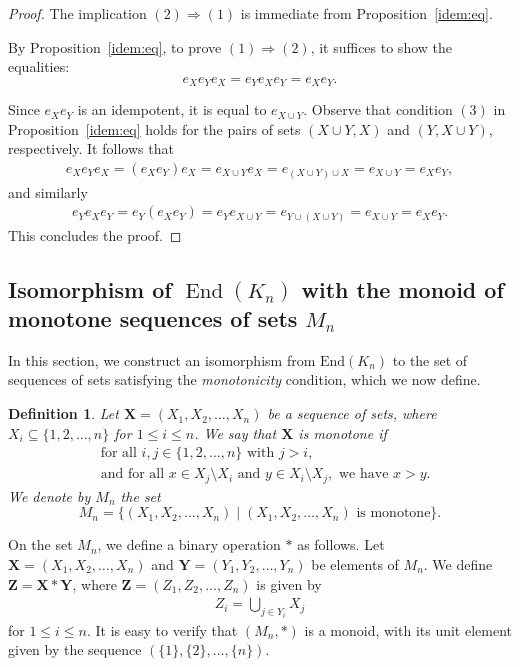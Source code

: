 \documentclass[pdflatex,sn-mathphys-num]{sn-jnl}%
\theoremstyle{thmstyleone}%
\theoremstyle{thmstyletwo}%
\theoremstyle{thmstylethree}%
\newtheorem{definition}{Definition}%
\begin{document}
\begin{proof}
   The implication \((2) \Rightarrow (1)\) is immediate from Proposition~\ref{idem:eq}.

   By Proposition~\ref{idem:eq}, to prove \((1) \Rightarrow (2)\), it suffices to show the equalities:
   \[
   e_X e_Y e_X = e_Y e_X e_Y = e_X e_Y.
   \]

   Since $e_X e_Y$ is an idempotent, it is equal to $e_{X \cup Y}$. Observe that condition $(3)$ in Proposition~\ref{idem:eq} holds for the pairs of sets $(X \cup Y, X)$ and $(Y, X \cup Y)$, respectively. It follows that 
   \begin{align*}
      e_X e_Y e_X = (e_X e_Y) e_X = e_{X \cup Y} e_X = e_{(X \cup Y) \cup X} = e_{X \cup Y} = e_X e_Y,
   \end{align*}
   and similarly
   \begin{align*}
      e_Y e_X e_Y = e_Y (e_X e_Y ) = e_Y e_{X \cup Y } = e_{Y \cup (X \cup Y)} = e_{X \cup Y} = e_X e_Y.
   \end{align*}
   This concludes the proof.
\end{proof}

\subsection{Isomorphism of $\operatorname{End}(K_n)$ with the monoid of monotone sequences of sets $M_n$}

In this section, we construct an isomorphism from $\text{End}(K_n)$ to the set of sequences of sets satisfying the \textit{monotonicity} condition, which we now define. 

\begin{definition}
   Let $\mathbf{X} = (X_1, X_2, \dots, X_n)$ be a sequence of sets, where $X_i \subseteq \{1, 2, \dots, n\}$ for $1 \leq i \leq n$. We say that $\mathbf{X}$ is \emph{monotone} if
   \begin{align*}
      &\text{for all } i, j \in \{1, 2, \dots, n\} \text{ with } j > i, \\
      &\text{and for all } x \in X_j \setminus X_i \text{ and } y \in X_i \setminus X_j, \text{ we have } x > y.
   \end{align*}
   We denote by $M_n$ the set
   \[
   M_n = \{(X_1, X_2, \dots, X_n) \mid (X_1, X_2, \dots, X_n) \text{ is monotone}\}.
   \]
\end{definition}



On the set $M_n$, we define a binary operation $\ast$ as follows.
Let $\mathbf{X} = (X_1, X_2, \dots, X_n)$ and $\mathbf{Y} = (Y_1, Y_2, \dots, Y_n)$ be elements of $M_n$. 
We define $\mathbf{Z} = \mathbf{X} \ast \mathbf{Y}$, where $\mathbf{Z} = (Z_1, Z_2, \dots, Z_n)$ is given by
\begin{align*}
   Z_i = \bigcup\limits_{j \in Y_i} X_j
\end{align*}
for $1 \leq i \leq n$. It is easy to verify that $(M_n, \ast)$ is a monoid, with its unit element given by the sequence $(\{1\}, \{2\}, \dots,\{n\})$.
\end{document}
